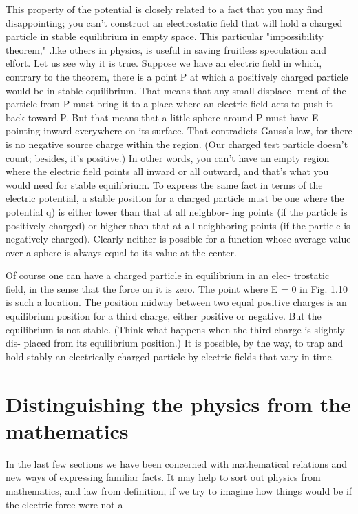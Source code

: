 This property of the potential is closely related to a fact that you
may find disappointing; you can't construct an electrostatic field that
will hold a charged particle in stable equilibrium in empty space.
This particular "impossibility theorem," .like others in physics, is
useful in saving fruitless speculation and elfort. Let us see why it
is true. Suppose we have an electric field in which, contrary to the
theorem, there is a point P at which a positively charged particle
would be in stable equilibrium. That means that any small displace-
ment of the particle from P must bring it to a place where an electric
field acts to push it back toward P. But that means that a little sphere
around P must have E pointing inward everywhere on its surface.
That contradicts Gauss's law, for there is no negative source charge
within the region. (Our charged test particle doesn't count; besides,
it's positive.) In other words, you can't have an empty region where
the electric field points all inward or all outward, and that's what you
would need for stable equilibrium. To express the same fact in terms
of the electric potential, a stable position for a charged particle must
be one where the potential q) is either lower than that at all neighbor-
ing points (if the particle is positively charged) or higher than that
at all neighboring points (if the particle is negatively charged).
Clearly neither is possible for a function whose average value over a
sphere is always equal to its value at the center.

Of course one can have a charged particle in equilibrium in an elec-
trostatic field, in the sense that the force on it is zero. The point
where E = 0 in Fig. 1.10 is such a location. The position midway
between two equal positive charges is an equilibrium position for a
third charge, either positive or negative. But the equilibrium is not
stable. (Think what happens when the third charge is slightly dis-
placed from its equilibrium position.) It is possible, by the way,
to trap and hold stably an electrically charged particle by electric
fields that vary in time.

\section{Distinguishing the physics from the mathematics}

In the last few sections we have been concerned with mathematical
relations and new ways of expressing familiar facts. It may help to
sort out physics from mathematics, and law from definition, if we
try to imagine how things would be if the electric force were not a

